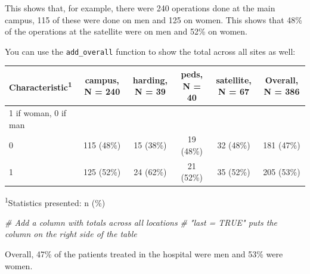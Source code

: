 \documentclass[]{book}
\newenvironment{Shaded}{\begin{snugshade}}{\end{snugshade}}
\newcommand{\CommentTok}[1]{\textcolor[rgb]{0.56,0.35,0.01}{\textit{#1}}}
\newcommand{\DataTypeTok}[1]{\textcolor[rgb]{0.13,0.29,0.53}{#1}}
\newcommand{\KeywordTok}[1]{\textcolor[rgb]{0.13,0.29,0.53}{\textbf{#1}}}
\newcommand{\NormalTok}[1]{#1}
\newcommand{\OperatorTok}[1]{\textcolor[rgb]{0.81,0.36,0.00}{\textbf{#1}}}
\newcommand{\OtherTok}[1]{\textcolor[rgb]{0.56,0.35,0.01}{#1}}
\newcommand{\StringTok}[1]{\textcolor[rgb]{0.31,0.60,0.02}{#1}}
\begin{document}
This shows that, for example, there were 240 operations done at the main campus, 115 of these were done on men and 125 on women. This shows that 48\% of the operations at the satellite were on men and 52\% on women.

You can use the \texttt{add\_overall} function to show the total across all sites as well:

\begin{Shaded}
\end{Shaded}

\captionsetup[table]{labelformat=empty,skip=1pt}
\begin{longtable}{lccccc}
\toprule
\textbf{Characteristic}\textsuperscript{1} & \textbf{campus}, N = 240 & \textbf{harding}, N = 39 & \textbf{peds}, N = 40 & \textbf{satellite}, N = 67 & \textbf{Overall}, N = 386 \\ 
\midrule
1 if woman, 0 if man &  &  &  &  &  \\ 
0 & 115 (48\%) & 15 (38\%) & 19 (48\%) & 32 (48\%) & 181 (47\%) \\ 
1 & 125 (52\%) & 24 (62\%) & 21 (52\%) & 35 (52\%) & 205 (53\%) \\ 
\bottomrule
\end{longtable}
\vspace{-5mm}
\begin{minipage}{\linewidth}
\textsuperscript{1}Statistics presented: n (\%) \\ 
\end{minipage}

\begin{Shaded}
\begin{Highlighting}[]
  \CommentTok{# Add a column with totals across all locations}
  \CommentTok{# "last = TRUE" puts the column on the right side of the table}
\end{Highlighting}
\end{Shaded}

Overall, 47\% of the patients treated in the hospital were men and 53\% were women.
\end{document}
